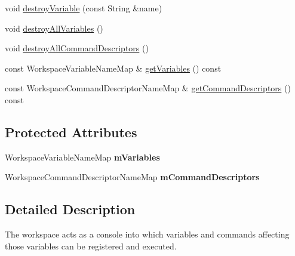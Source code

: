 \begin{DoxyCompactItemize}
\item 
void \hyperlink{class_verdi_1_1_workspace_a5e52d6519fc42eab43ac4165bf089ff7}{destroy\-Variable} (const \-String \&name)
\item 
void \hyperlink{class_verdi_1_1_workspace_a0cf5e6e0131c6155137bc6bf1f271d91}{destroy\-All\-Variables} ()
\item 
void \hyperlink{class_verdi_1_1_workspace_a93742c3c059fcd22fdc1bc8b94bd2aa4}{destroy\-All\-Command\-Descriptors} ()
\item 
const \-Workspace\-Variable\-Name\-Map \& \hyperlink{class_verdi_1_1_workspace_ae332be19fc1b0cb959a2f78c50d25a71}{get\-Variables} () const 
\item 
const \*
\-Workspace\-Command\-Descriptor\-Name\-Map \& \hyperlink{class_verdi_1_1_workspace_a64826e428fee004aced6f784b366562a}{get\-Command\-Descriptors} () const 
\end{DoxyCompactItemize}
\subsection*{\-Protected \-Attributes}
\begin{DoxyCompactItemize}
\item 
\hypertarget{class_verdi_1_1_workspace_a10a811134ebe19d6bc28e4aea3b886da}{\-Workspace\-Variable\-Name\-Map {\bfseries m\-Variables}}\label{class_verdi_1_1_workspace_a10a811134ebe19d6bc28e4aea3b886da}

\item 
\hypertarget{class_verdi_1_1_workspace_a07c609715e5cbc70e28132acd87364c6}{\-Workspace\-Command\-Descriptor\-Name\-Map {\bfseries m\-Command\-Descriptors}}\label{class_verdi_1_1_workspace_a07c609715e5cbc70e28132acd87364c6}

\end{DoxyCompactItemize}


\subsection{\-Detailed \-Description}
\-The workspace acts as a console into which variables and commands affecting those variables can be registered and executed. 

